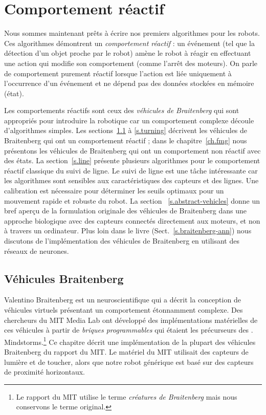 

\chapter{Comportement réactif}\label{ch.reactive}

Nous sommes maintenant prêts à écrire nos premiers algorithmes pour les robots. Ces algorithmes démontrent un \emph{comportement réactif} : un événement (tel que la détection d'un objet proche par le robot) amène le robot à réagir en effectuant une action qui modifie son comportement (comme l'arrêt des moteurs). On parle de comportement purement réactif lorsque l'action est liée uniquement à l'occurrence d'un événement et ne dépend pas des données stockées en mémoire (état).

Les comportements réactifs sont ceux des \emph{véhicules de Braitenberg} qui sont appropriés pour introduire la robotique car un comportement complexe découle d'algorithmes simples. Les sections~\ref{s.braitenberg} à \ref{s.turning} décrivent les véhicules de Braitenberg qui ont un comportement réactif ; dans le chapitre~\ref{ch.fmg} nous présentons les véhicules de Braitenberg qui ont un comportement non réactif avec des états. La section~\ref{s.line} présente plusieurs algorithmes pour le comportement réactif classique du suivi de ligne. Le suivi de ligne est une tâche intéressante car les algorithmes sont sensibles aux caractéristiques des capteurs et des lignes. Une calibration est nécessaire pour déterminer les seuils optimaux pour un mouvement rapide et robuste du robot. La section ~\ref{s.abstract-vehicles} donne un bref aperçu de la formulation originale des véhicules de Braitenberg dans une approche biologique avec des capteurs connectés directement aux moteurs, et non à travers un ordinateur. Plus loin dans le livre (Sect.~\ref{s.braitenberg-ann}) nous discutons de l'implémentation des véhicules de Braitenberg en utilisant des réseaux de neurones.

\section{Véhicules Braitenberg}\label{s.braitenberg}

Valentino Braitenberg est un neuroscientifique qui a décrit la conception de véhicules virtuels présentant un comportement étonnamment complexe. Des chercheurs du MIT Media Lab ont développé des implémentations matérielles de ces véhicules à partir de \emph{briques programmables} qui étaient les précurseurs des \lego{}. Mindstorms.\footnote{Le rapport du MIT utilise le terme \emph{créatures de Braitenberg} mais nous conservons le terme original.} Ce chapitre décrit une implémentation de la plupart des véhicules Braitenberg du rapport du MIT. Le matériel du MIT utilisait des capteurs de lumière et de toucher, alors que notre robot générique est basé sur des capteurs de proximité horizontaux.

